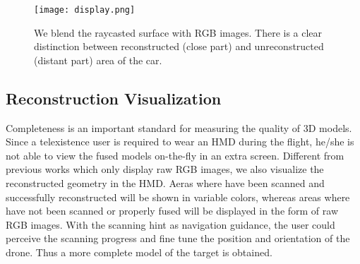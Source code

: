 \documentclass[journal]{IEEEtran}
\begin{document}
\begin{figure}[t]
  \centering
  \texttt{[image: display.png]}
  \caption{We blend the raycasted surface with RGB images. There is a clear distinction between 
  reconstructed (close part) and unreconstructed (distant part) area of the car.}
  \label{fig:display}
\end{figure}

\subsection{Reconstruction Visualization}
\label{sec:visulization}
Completeness is an important standard for measuring the quality of 3D models. 
Since a telexistence user is required to wear an HMD during the flight, he/she is not able to view the 
fused models on-the-fly in an extra screen.  
Different from previous works which only display raw RGB images, we also visualize the 
reconstructed geometry in the HMD. Aeras where have been scanned and successfully reconstructed 
will be shown in variable colors, whereas areas where have not been scanned or properly fused will be displayed in 
the form of raw RGB images. With the scanning hint as navigation guidance, the user could perceive the scanning progress and fine tune 
the position and orientation of the drone. Thus a more complete model of the target is obtained.
\end{document}
